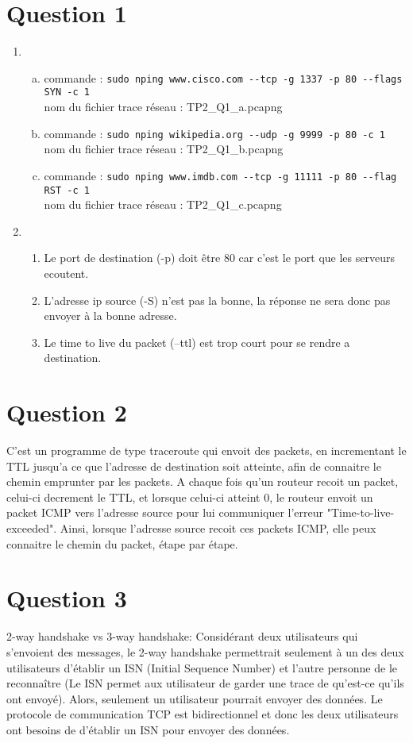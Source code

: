 
\section{Question 1}
\begin{enumerate}
	\item 
	\begin{enumerate}[a)]
		\item 
			commande : \verb!sudo nping www.cisco.com --tcp -g 1337 -p 80 --flags SYN -c 1!\\
			nom du fichier trace réseau : TP2\_Q1\_a.pcapng
		\item 
			commande : \verb!sudo nping wikipedia.org --udp -g 9999 -p 80 -c 1!\\
			nom du fichier trace réseau : TP2\_Q1\_b.pcapng
		\item 
			commande : \verb!sudo nping www.imdb.com --tcp -g 11111 -p 80 --flag RST -c 1!\\
			nom du fichier trace réseau : TP2\_Q1\_c.pcapng
	\end{enumerate}
	\item 
		\begin{enumerate}
			\item
				Le port de destination (-p) doit être 80 
				car c'est le port que les serveurs ecoutent.
			\item
				L'adresse ip source (-S) n'est pas la bonne,
				la réponse ne sera donc pas envoyer à la bonne
				adresse.
			\item
				Le time to live du packet (--ttl) est trop court
				pour se rendre a destination.
		\end{enumerate}
\end{enumerate}

\section{Question 2}
C'est un programme de type traceroute qui envoit des packets, 
en incrementant le TTL jusqu'a ce que l'adresse de destination soit 
atteinte, afin de connaitre le chemin emprunter par les packets. 
A chaque fois qu'un routeur recoit un packet, 
celui-ci decrement le TTL, et lorsque celui-ci atteint 0,
le routeur envoit un packet ICMP vers l'adresse source pour lui
communiquer l'erreur "Time-to-live-exceeded". Ainsi, lorsque 
l'adresse source recoit ces packets ICMP, 
elle peux connaitre le chemin du packet, étape par étape.

\section{Question 3}
2-way handshake vs 3-way handshake:
Considérant deux utilisateurs qui s’envoient des messages, le 2-way handshake permettrait seulement à un des deux utilisateurs d’établir un ISN (Initial Sequence Number) et l’autre personne de le reconnaître (Le ISN permet aux utilisateur de garder une trace de qu’est-ce qu’ils ont envoyé). Alors, seulement un utilisateur pourrait envoyer des données. Le protocole de communication TCP est bidirectionnel et donc les deux utilisateurs ont besoins de d’établir un ISN pour envoyer des données.

